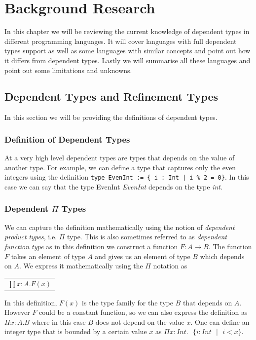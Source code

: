 \documentclass[a4paper,12pt]{report}
\begin{document}
\chapter{Background Research} 
In this chapter we will be reviewing the current knowledge of dependent types 
in different programming languages. It will cover languages with full dependent 
types support as well as some languages with similar concepts and point out how 
it differs from dependent types. Lastly we will summarise all these languages 
and point out some limitations and unknowns. 

\section{Dependent Types and Refinement Types}
In this section we will be providing the definitions of dependent types.

\subsection{Definition of Dependent Types}
At a very high level dependent types are types that depends on the value of 
another type. For example, we can define a type that captures only the even 
integers using the definition 
\verb+type EvenInt := { i : Int | i % 2 = 0}+. In this case we 
can say that the type EvenInt \textit{EvenInt} depends on the type \textit{int}.

\subsection{Dependent $\Pi$ Types}
We can capture the definition mathematically using the notion of \textit{dependent 
product types}, i.e. $\Pi$ type. This is also sometimes referred to as 
\textit{dependent function type} as in this definition we construct a function 
$F: A \rightarrow B$. The function $F$ takes an element of type $A$ and 
gives us an element of type $B$ which depends on $A$. We express it 
mathematically using the $\Pi$ notation as
\begin{center}
 \begin{tabular}{l}
   $\prod x: A.  F(x)$
 \end{tabular} 
\end{center}

In this definition, $F(x)$ is the type family for the type $B$ that depends on $A$.
However $F$ could be a constant function, so we can also express the definition 
as $\Pi x:A.B$ where in this case $B$ does not depend 
on the value $x$. One can define an integer type that is bounded by a certain 
value $x$ as $\Pi x:Int.\text{ }\{ i:Int\text{ }|\text{ }i < x\}$.
\end{document}
